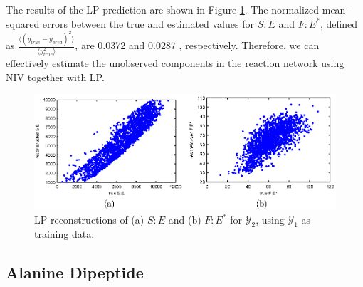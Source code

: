 The results of the LP prediction are shown in Figure \ref{fig:rxn_recon}.
%
The normalized mean-squared errors between the true and estimated values for $S:E$ and $F:E^{*}$, defined as $\frac{\langle (y_{true}-y_{pred})^2 \rangle}{\langle y_{true}^2 \rangle}$, are 0.0372 and 0.0287 , respectively.
%
Therefore, we can effectively estimate the unobserved components in the reaction network using NIV together with LP.
%

\begin{figure}[t]
    \includegraphics[width=6in]{fig5}
    \caption[Laplacian Pyramids reconstructions for chemical reaction network data]{LP reconstructions of (a) $S:E$ and (b) $F:E^{*}$ for $\mathcal{Y}_2$, using $\mathcal{Y}_1$ as training data.}
    \label{fig:rxn_recon}
\end{figure}

\subsection{Alanine Dipeptide}

